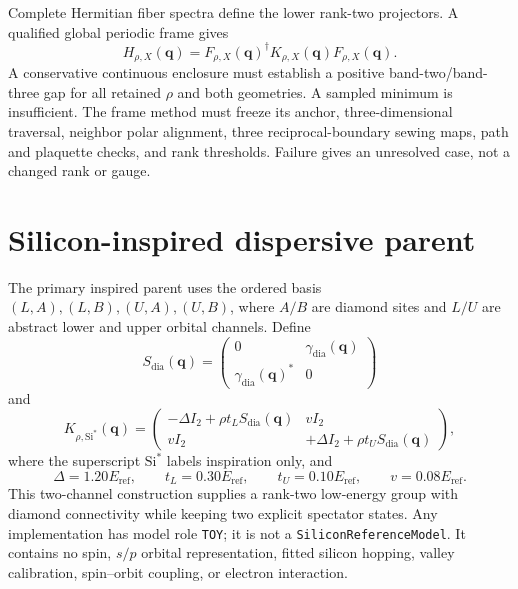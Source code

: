 \documentclass[11pt]{article}
\begin{document}
Complete Hermitian fiber spectra define the lower rank-two projectors.  A qualified
global periodic frame gives
\begin{equation}
 H_{\rho,X}(\mathbf q)
 =F_{\rho,X}(\mathbf q)^\dagger
  K_{\rho,X}(\mathbf q)F_{\rho,X}(\mathbf q).
\end{equation}
A conservative continuous enclosure must establish a positive band-two/band-three gap
for all retained $\rho$ and both geometries.  A sampled minimum is insufficient.  The
frame method must freeze its anchor, three-dimensional traversal, neighbor polar
alignment, three reciprocal-boundary sewing maps, path and plaquette checks, and rank
thresholds.  Failure gives an unresolved case, not a changed rank or gauge.

\section{Silicon-inspired dispersive parent}

The primary inspired parent uses the ordered basis
$(L,A),(L,B),(U,A),(U,B)$, where $A/B$ are diamond sites and $L/U$ are abstract lower
and upper orbital channels.  Define
\begin{equation}
 S_{\mathrm{dia}}(\mathbf q)=
 \begin{pmatrix}
 0&\gamma_{\mathrm{dia}}(\mathbf q)\\
 \gamma_{\mathrm{dia}}(\mathbf q)^*&0
 \end{pmatrix}
\end{equation}
and
\begin{equation}
 K_{\rho,\mathrm{Si}^*}(\mathbf q)=
 \begin{pmatrix}
 -\Delta I_2+\rho t_LS_{\mathrm{dia}}(\mathbf q)&vI_2\\
 vI_2&+\Delta I_2+\rho t_US_{\mathrm{dia}}(\mathbf q)
 \end{pmatrix},
 \label{eq:silicon-inspired-parent}
\end{equation}
where the superscript $\mathrm{Si}^*$ labels inspiration only, and
\begin{equation}
 \Delta=1.20E_{\mathrm{ref}},
 \qquad t_L=0.30E_{\mathrm{ref}},
 \qquad t_U=0.10E_{\mathrm{ref}},
 \qquad v=0.08E_{\mathrm{ref}}.
\end{equation}
This two-channel construction supplies a rank-two low-energy group with diamond
connectivity while keeping two explicit spectator states.  Any implementation has model
role \texttt{TOY}; it is not a \texttt{SiliconReferenceModel}.  It contains no spin,
$s/p$ orbital representation, fitted silicon hopping, valley calibration, spin--orbit
coupling, or electron interaction.
\end{document}
